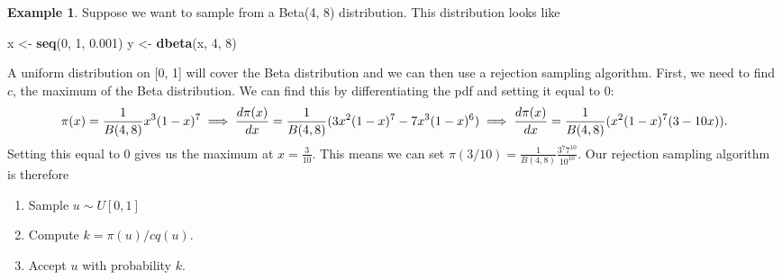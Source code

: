 \documentclass[
]{book}
\newenvironment{Shaded}{\begin{snugshade}}{\end{snugshade}}
\newcommand{\DecValTok}[1]{\textcolor[rgb]{0.00,0.00,0.81}{#1}}
\newcommand{\FloatTok}[1]{\textcolor[rgb]{0.00,0.00,0.81}{#1}}
\newcommand{\FunctionTok}[1]{\textcolor[rgb]{0.13,0.29,0.53}{\textbf{#1}}}
\newcommand{\NormalTok}[1]{#1}
\newcommand{\OtherTok}[1]{\textcolor[rgb]{0.56,0.35,0.01}{#1}}
\providecommand{\tightlist}{%
  \setlength{\itemsep}{0pt}\setlength{\parskip}{0pt}}
\theoremstyle{definition}
\theoremstyle{definition}
\newtheorem{example}{Example}[chapter]
\theoremstyle{definition}
\theoremstyle{definition}
\theoremstyle{remark}
\begin{document}
\begin{example}

Suppose we want to sample from a Beta(4, 8) distribution. This distribution looks like

\begin{Shaded}
\begin{Highlighting}[]
\NormalTok{x }\OtherTok{\textless{}{-}} \FunctionTok{seq}\NormalTok{(}\DecValTok{0}\NormalTok{, }\DecValTok{1}\NormalTok{, }\FloatTok{0.001}\NormalTok{)}
\NormalTok{y }\OtherTok{\textless{}{-}} \FunctionTok{dbeta}\NormalTok{(x, }\DecValTok{4}\NormalTok{, }\DecValTok{8}\NormalTok{)}
\end{Highlighting}
\end{Shaded}

A uniform distribution on {[}0, 1{]} will cover the Beta distribution and we can then use a rejection sampling algorithm. First, we need to find \(c\), the maximum of the Beta distribution. We can find this by differentiating the pdf and setting it equal to 0:
\[
\pi(x) = \frac{1}{B(4, 8)}x^3(1-x)^7 \\
\implies \frac{d \pi(x)}{d x} = \frac{1}{B(4, 8)}(3x^2(1-x)^7 - 7x^3(1-x)^6) \\
\implies \frac{d \pi(x)}{d x} = \frac{1}{B(4, 8)}(x^2(1-x)^7(3-10x)).
\]
Setting this equal to 0 gives us the maximum at \(x = \frac{3}{10}\). This means we can set \(\pi(3/10) = \frac{1}{B(4, 8)} \frac{3^7 7^{10}}{10^{10}}\). Our rejection sampling algorithm is therefore

\begin{enumerate}
\def\labelenumi{\arabic{enumi}.}
\tightlist
\item
  Sample \(u \sim U[0, 1]\)
\item
  Compute \(k = \pi(u)/cq(u)\).
\item
  Accept \(u\) with probability \(k\).
\end{enumerate}

\end{example}
\end{document}
